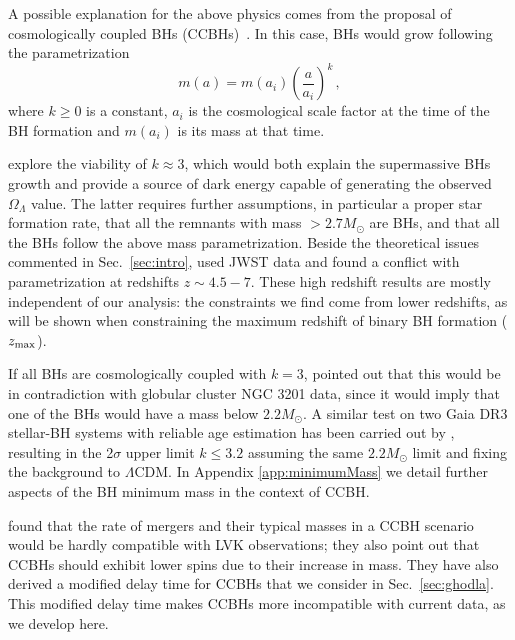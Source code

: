 \documentclass[fleqn,usenatbib,useAMS]{mnras}
\begin{document}
A possible explanation for the above physics comes from the proposal of cosmologically coupled BHs (CCBHs)~\citep{Faraoni:2007es, Croker:2019mup, Croker:2021duf}. In this case, BHs would grow following the parametrization \citep{Croker:2021duf} 
\begin{equation} \label{MkParametrization}
    m(a) = m(a_i) \left( \frac{a}{a_i}\right )^k \, ,
\end{equation} 
where $k\ge 0$ is a constant, $a_i$ is the cosmological scale factor at the time of the BH formation and $m(a_i)$ is its mass at that time.

\citet{Farrah:2023opk} explore the viability of  $k\approx 3$, which would both explain the supermassive BHs growth and provide a  source of dark energy capable of generating the observed $\Omega_\Lambda$ value. The latter requires further assumptions, in particular a proper star formation rate,  that all the remnants with mass $> 2.7$$M_\odot$ are BHs, and that all the BHs follow the above mass parametrization.  
Beside  the theoretical issues commented in Sec.~\ref{sec:intro}, \citet{Lei:2023mke} used JWST data and found a conflict with \citet{2023ApJ...943..133F} parametrization at redshifts $z \sim 4.5 - 7$. These high redshift results are mostly independent of our analysis: the constraints we find come from lower redshifts, as will be shown when constraining the maximum redshift of binary BH formation ($z_{\rm max}$). 

If all BHs are cosmologically coupled with $k=3$, \citet{Rodriguez:2023gaa} pointed out that this would be in contradiction with globular cluster NGC 3201 data, since it would imply that one of the BHs would have a mass below $2.2 M_\odot$. 
A similar test on two Gaia DR3 stellar-BH systems with reliable age estimation has been carried out by \citet{Andrae:2023wge}, resulting in the 2$\sigma$ upper limit $k\leq3.2$ assuming the same $2.2 M_\odot$ limit and fixing the background to $\Lambda$CDM. In Appendix \ref{app:minimumMass} we detail further aspects of the BH minimum mass in the context of CCBH.

\citet{Ghodla:2023iaz} found that the rate of mergers and their typical masses in a CCBH scenario would be hardly compatible with LVK observations; they also point out that CCBHs should exhibit  lower spins  due to their increase in mass. They have also derived a modified delay time for CCBHs that we consider in Sec.~\ref{sec:ghodla}.
This modified delay time makes CCBHs more incompatible with current data, as we develop here. 
\end{document}
